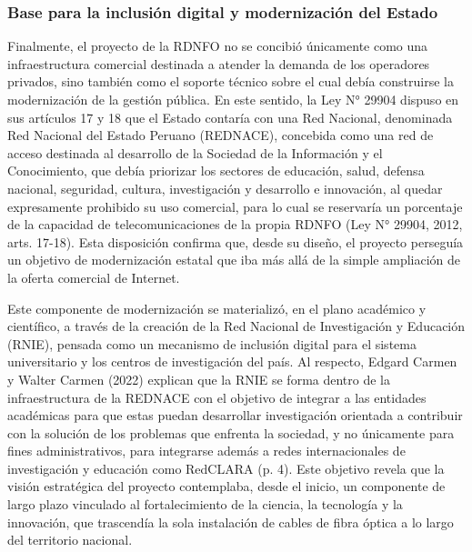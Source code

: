 \subsubsection{Base para la inclusión digital y modernización del Estado}
Finalmente, el proyecto de la RDNFO no se concibió únicamente como una infraestructura comercial destinada a atender la demanda de los operadores privados, sino también como el soporte técnico sobre el cual debía construirse la modernización de la gestión pública. En este sentido, la Ley N° 29904 dispuso en sus artículos 17 y 18 que el Estado contaría con una Red Nacional, denominada Red Nacional del Estado Peruano (REDNACE), concebida como una red de acceso destinada al desarrollo de la Sociedad de la Información y el Conocimiento, que debía priorizar los sectores de educación, salud, defensa nacional, seguridad, cultura, investigación y desarrollo e innovación, al quedar expresamente prohibido su uso comercial, para lo cual se reservaría un porcentaje de la capacidad de telecomunicaciones de la propia RDNFO (Ley N° 29904, 2012, arts. 17-18). Esta disposición confirma que, desde su diseño, el proyecto perseguía un objetivo de modernización estatal que iba más allá de la simple ampliación de la oferta comercial de Internet.

Este componente de modernización se materializó, en el plano académico y científico, a través de la creación de la Red Nacional de Investigación y Educación (RNIE), pensada como un mecanismo de inclusión digital para el sistema universitario y los centros de investigación del país. Al respecto, Edgard Carmen y Walter Carmen (2022) explican que la RNIE se forma dentro de la infraestructura de la REDNACE con el objetivo de integrar a las entidades académicas para que estas puedan desarrollar investigación orientada a contribuir con la solución de los problemas que enfrenta la sociedad, y no únicamente para fines administrativos, para integrarse además a redes internacionales de investigación y educación como RedCLARA (p. 4). Este objetivo revela que la visión estratégica del proyecto contemplaba, desde el inicio, un componente de largo plazo vinculado al fortalecimiento de la ciencia, la tecnología y la innovación, que trascendía la sola instalación de cables de fibra óptica a lo largo del territorio nacional.